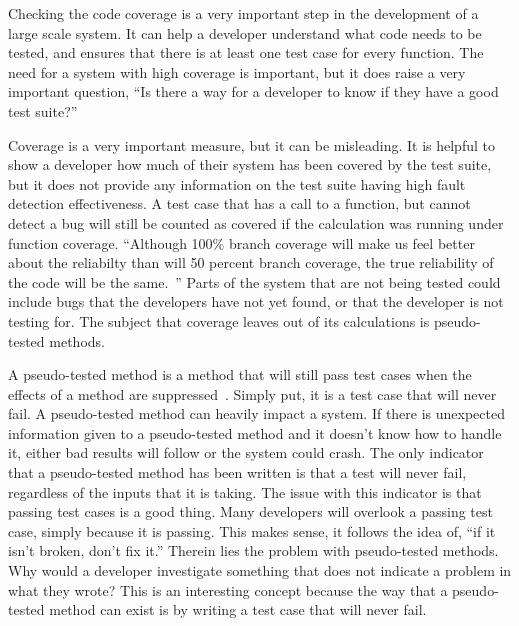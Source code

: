 Checking the code coverage is a very important step in the development of a large scale system. It can help a developer understand what code needs to be tested, and ensures that there is at least one test case for every function. The need for a system with high coverage is important, but it does raise a very important question, ``Is there a way for a developer to know if they have a good test suite?''

Coverage is a very important measure, but it can be misleading. It is helpful to show a developer how much of their system has been covered by the test suite, but it does not provide any information on the test suite having high fault detection effectiveness. A test case that has a call to a function, but cannot detect a bug will still be counted as covered if the calculation was running under function coverage. ``Although 100\% branch coverage will make us feel better about the reliabilty than will 50 percent branch coverage, the true reliability of the code will be the same.~\cite{friedman_voas_1995}'' Parts of the system that are not being tested could include bugs that the developers have not yet found, or that the developer is not testing for. The subject that coverage leaves out of its calculations is pseudo-tested methods.

A pseudo-tested method is a method that will still pass test cases when the effects of a method are suppressed~\cite{vera2017comprehensive}. Simply put, it is a test case that will never fail. A pseudo-tested method can heavily impact a system. If there is unexpected information given to a pseudo-tested method and it doesn't know how to handle it, either bad results will follow or the system could crash. The only indicator that a pseudo-tested method has been written is that a test will never fail, regardless of the inputs that it is taking. The issue with this indicator is that passing test cases is a good thing. Many developers will overlook a passing test case, simply because it is passing. This makes sense, it follows the idea of, ``if it isn't broken, don't fix it.'' Therein lies the problem with pseudo-tested methods. Why would a developer investigate something that does not indicate a problem in what they wrote? This is an interesting concept because the way that a pseudo-tested method can exist is by writing a test case that will never fail.

